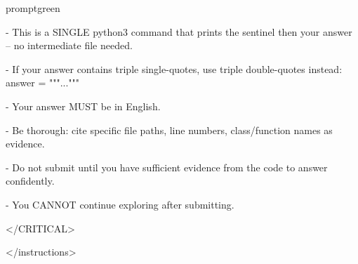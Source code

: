 \begin{promptbox}{promptgreen}
{- This is a SINGLE python3 command that prints the sentinel then your answer -- no intermediate file needed.\par
- If your answer contains triple single-quotes, use triple double-quotes instead: answer = """..."""\par
- Your answer MUST be in English.\par
- Be thorough: cite specific file paths, line numbers, class/function names as evidence.\par
- Do not submit until you have sufficient evidence from the code to answer confidently.\par
- You CANNOT continue exploring after submitting.\par
\textless{}/CRITICAL\textgreater{}\par
\textless{}/instructions\textgreater{}\par
}
\end{promptbox}

